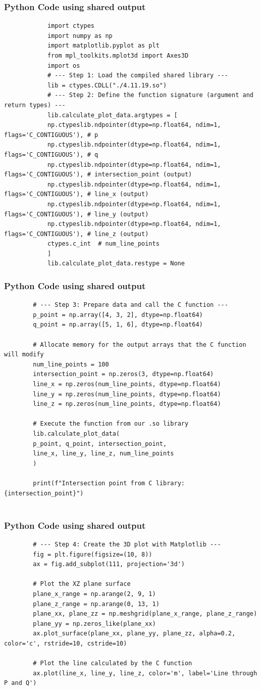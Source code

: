 \documentclass{beamer}
\begin{document}
	\begin{frame}[fragile]
		\frametitle{Python Code using shared output}
		\begin{lstlisting}
			import ctypes
			import numpy as np
			import matplotlib.pyplot as plt
			from mpl_toolkits.mplot3d import Axes3D
			import os
			# --- Step 1: Load the compiled shared library ---
			lib = ctypes.CDLL("./4.11.19.so")
			# --- Step 2: Define the function signature (argument and return types) ---
			lib.calculate_plot_data.argtypes = [
			np.ctypeslib.ndpointer(dtype=np.float64, ndim=1, flags='C_CONTIGUOUS'), # p
			np.ctypeslib.ndpointer(dtype=np.float64, ndim=1, flags='C_CONTIGUOUS'), # q
			np.ctypeslib.ndpointer(dtype=np.float64, ndim=1, flags='C_CONTIGUOUS'), # intersection_point (output)
			np.ctypeslib.ndpointer(dtype=np.float64, ndim=1, flags='C_CONTIGUOUS'), # line_x (output)
			np.ctypeslib.ndpointer(dtype=np.float64, ndim=1, flags='C_CONTIGUOUS'), # line_y (output)
			np.ctypeslib.ndpointer(dtype=np.float64, ndim=1, flags='C_CONTIGUOUS'), # line_z (output)
			ctypes.c_int  # num_line_points
			]
			lib.calculate_plot_data.restype = None
		\end{lstlisting}
	\end{frame}
	\begin{frame}[fragile]
		\frametitle{Python Code using shared output}
		\begin{lstlisting}		
		# --- Step 3: Prepare data and call the C function ---
		p_point = np.array([4, 3, 2], dtype=np.float64)
		q_point = np.array([5, 1, 6], dtype=np.float64)
		
		# Allocate memory for the output arrays that the C function will modify
		num_line_points = 100
		intersection_point = np.zeros(3, dtype=np.float64)
		line_x = np.zeros(num_line_points, dtype=np.float64)
		line_y = np.zeros(num_line_points, dtype=np.float64)
		line_z = np.zeros(num_line_points, dtype=np.float64)
		
		# Execute the function from our .so library
		lib.calculate_plot_data(
		p_point, q_point, intersection_point,
		line_x, line_y, line_z, num_line_points
		)
		
		print(f"Intersection point from C library: {intersection_point}")
			
		\end{lstlisting}
	\end{frame}
	\begin{frame}[fragile]
		\frametitle{Python Code using shared output}
		\begin{lstlisting}
		# --- Step 4: Create the 3D plot with Matplotlib ---
		fig = plt.figure(figsize=(10, 8))
		ax = fig.add_subplot(111, projection='3d')
		
		# Plot the XZ plane surface
		plane_x_range = np.arange(2, 9, 1)
		plane_z_range = np.arange(0, 13, 1)
		plane_xx, plane_zz = np.meshgrid(plane_x_range, plane_z_range)
		plane_yy = np.zeros_like(plane_xx)
		ax.plot_surface(plane_xx, plane_yy, plane_zz, alpha=0.2, color='c', rstride=10, cstride=10)
		
		# Plot the line calculated by the C function
		ax.plot(line_x, line_y, line_z, color='m', label='Line through P and Q')
		\end{lstlisting}
	\end{frame}
\end{document}
